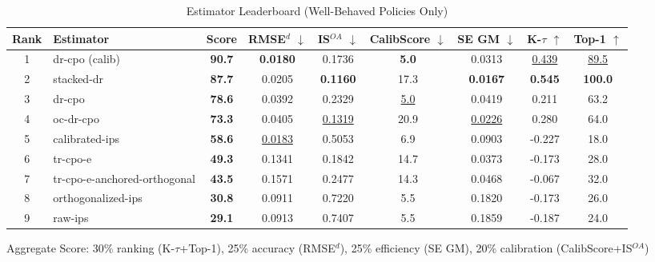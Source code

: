 \begin{table}[htbp]
\centering
\caption{Estimator Leaderboard (Well-Behaved Policies Only)}
\label{tab:leaderboard}
\begin{tabular}{cl|c|cccccc}
\toprule
Rank & Estimator & Score & RMSE$^d$ $\downarrow$ & IS$^{OA}$ $\downarrow$ & CalibScore $\downarrow$ & SE GM $\downarrow$ & K-$\tau$ $\uparrow$ & Top-1 $\uparrow$ \\
\midrule
1 & dr-cpo (calib) & \textbf{90.7} & \textbf{0.0180} & 0.1736 & \textbf{5.0} & 0.0313 & \underline{0.439} & \underline{89.5} \\
2 & stacked-dr & \textbf{87.7} & 0.0205 & \textbf{0.1160} & 17.3 & \textbf{0.0167} & \textbf{0.545} & \textbf{100.0} \\
3 & dr-cpo & \textbf{78.6} & 0.0392 & 0.2329 & \underline{5.0} & 0.0419 & 0.211 & 63.2 \\
4 & oc-dr-cpo & \textbf{73.3} & 0.0405 & \underline{0.1319} & 20.9 & \underline{0.0226} & 0.280 & 64.0 \\
5 & calibrated-ips & \textbf{58.6} & \underline{0.0183} & 0.5053 & 6.9 & 0.0903 & -0.227 & 18.0 \\
6 & tr-cpo-e & \textbf{49.3} & 0.1341 & 0.1842 & 14.7 & 0.0373 & -0.173 & 28.0 \\
7 & tr-cpo-e-anchored-orthogonal & \textbf{43.5} & 0.1571 & 0.2477 & 14.3 & 0.0468 & -0.067 & 32.0 \\
8 & orthogonalized-ips & \textbf{30.8} & 0.0911 & 0.7220 & 5.5 & 0.1820 & -0.173 & 26.0 \\
9 & raw-ips & \textbf{29.1} & 0.0913 & 0.7407 & 5.5 & 0.1859 & -0.187 & 24.0 \\
\bottomrule
\end{tabular}
\footnotesize{Aggregate Score: 30\% ranking (K-$\tau$+Top-1), 25\% accuracy (RMSE$^d$), 25\% efficiency (SE GM), 20\% calibration (CalibScore+IS$^{OA}$)}
\end{table}
